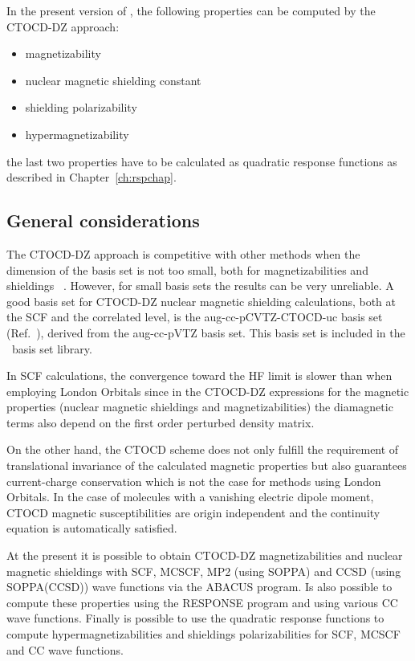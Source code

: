 In the present version of \dalton, the following properties can be computed by
the CTOCD-DZ approach:

\begin{center}
\begin{itemize}{}{}
\item magnetizability
\item nuclear magnetic shielding constant
\item shielding polarizability
\item hypermagnetizability
\end{itemize}
\end{center}
the last two properties have to be calculated as quadratic response functions as described 
in Chapter~\ref{ch:rspchap}.

\subsection{General considerations}\label{sec:ctocdgeneral}

The CTOCD-DZ approach is competitive with other methods when the dimension
of the basis set is not too small, both for magnetizabilities and
shieldings ~\cite{ctocd}. However, for small basis sets the results can be 
very unreliable. A good basis set for CTOCD-DZ nuclear magnetic shielding 
calculations, both at the SCF and the correlated level, is the aug-cc-pCVTZ-CTOCD-uc
basis set (Ref.~\cite{ctocd}), derived from the aug-cc-pVTZ basis set.  
This basis set is included in the \dalton\ basis set library.

In SCF calculations, the convergence toward the HF limit is slower 
than when employing London Orbitals since in the CTOCD-DZ expressions for 
the magnetic properties (nuclear magnetic shieldings and magnetizabilities) 
the diamagnetic terms also depend on the first order perturbed density matrix.

On the other hand, the CTOCD scheme does not only fulfill the requirement of
translational invariance of the calculated magnetic properties but also
guarantees current-charge conservation which is not the case for methods using
London Orbitals. In the case of molecules with a vanishing electric dipole
moment, CTOCD magnetic susceptibilities are origin independent and the
continuity equation is automatically satisfied.  

At the present it is possible to obtain CTOCD-DZ magnetizabilities and nuclear
magnetic shieldings with SCF, MCSCF, MP2 (using SOPPA) and CCSD (using
SOPPA(CCSD)) wave functions via the ABACUS program. Is also possible to
compute these properties using the RESPONSE program and using various CC wave
functions.  Finally is possible to use the quadratic response functions to
compute hypermagnetizabilities and shieldings polarizabilities for SCF, MCSCF
and CC wave functions. 

